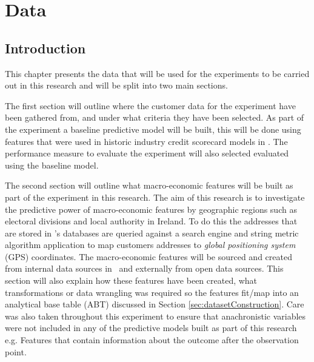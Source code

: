 
\chapter{Data} %

\label{Chapter3} %


\section{Introduction}
This chapter presents the data that will be used for the experiments to be carried out in this research and will be split into two main sections. 

The first section will outline where the customer data for the experiment have been gathered from, and under what criteria they have been selected. As part of the experiment a baseline predictive model will be built, this will be done using features that were used in historic industry credit scorecard models in \subjectname. The performance measure to evaluate the experiment will also selected evaluated using the baseline model.

The second section will outline what macro-economic features will be built as part of the experiment in this research. The aim of this research is to investigate the predictive power of macro-economic features by geographic regions such as electoral divisions and local authority in Ireland. To do this the addresses that are stored in \subjectname's databases are queried against a search engine and string metric algorithm application to map customers addresses to \textit{global positioning system} (GPS) coordinates. The macro-economic features will be sourced and created from internal data sources in \subjectname\ and externally from open data sources. This section will also explain how these features have been created, what transformations or data wrangling was required so the features fit/map into an analytical base table (ABT) discussed in Section \ref{sec:datasetConstruction}. Care was also taken throughout this experiment to ensure that anachronistic variables were not included in any of the predictive models built as part of this research e.g. Features that contain information about the outcome after the observation point. 

